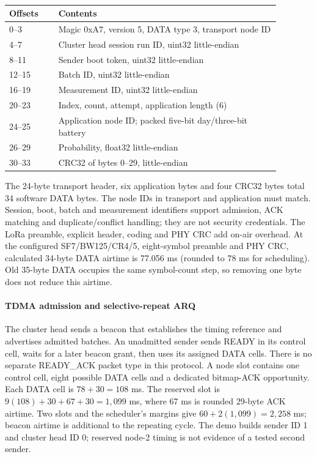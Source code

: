 \begin{table}[htbp]
\centering\small\color{black}
\caption{}
\label{tab:current_result_packet}
\begin{tabular}{p{0.16\linewidth}p{0.72\linewidth}}
\toprule
Offsets & Contents \\
\midrule
0--3 & Magic 0xA7, version 5, DATA type 3, transport node ID \\
4--7 & Cluster head session run ID, uint32 little-endian \\
8--11 & Sender boot token, uint32 little-endian \\
12--15 & Batch ID, uint32 little-endian \\
16--19 & Measurement ID, uint32 little-endian \\
20--23 & Index, count, attempt, application length (6) \\
24--25 & Application node ID; packed five-bit day/three-bit battery \\
26--29 & Probability, float32 little-endian \\
30--33 & CRC32 of bytes 0--29, little-endian \\
\bottomrule
\end{tabular}
\end{table}
The 24-byte transport header, six application bytes and four CRC32 bytes total 34 software DATA bytes. The node IDs in transport and application must match. Session, boot, batch and measurement identifiers support admission, ACK matching and duplicate/conflict handling; they are not security credentials. The LoRa preamble, explicit header, coding and PHY CRC add on-air overhead. At the configured SF7/BW125/CR4/5, eight-symbol preamble and PHY CRC, calculated 34-byte DATA airtime is 77.056 ms (rounded to 78 ms for scheduling). Old 35-byte DATA occupies the same symbol-count step, so removing one byte does not reduce this airtime.
\FloatBarrier

\paragraph{TDMA admission and selective-repeat ARQ}
The cluster head sends a beacon that establishes the timing reference and advertises admitted batches. An unadmitted sender sends READY in its control cell, waits for a later beacon grant, then uses its assigned DATA cells. There is no separate READY\_ACK packet type in this protocol. A node slot contains one control cell, eight possible DATA cells and a dedicated bitmap-ACK opportunity. Each DATA cell is $78+30=108$ ms. The reserved slot is $9(108)+30+67+30=1{,}099$ ms, where 67 ms is rounded 29-byte ACK airtime. Two slots and the scheduler's margins give $60+2(1{,}099)=2{,}258$ ms; beacon airtime is additional to the repeating cycle. The demo builds sender ID 1 and cluster head ID 0; reserved node-2 timing is not evidence of a tested second sender.


